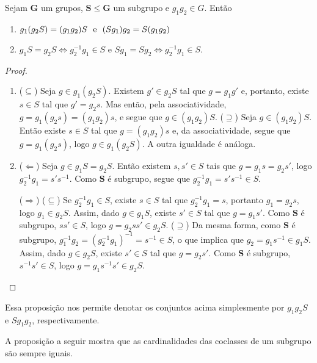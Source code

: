 \begin{proposition}
\label{alge:prop.gru.coclas}
Sejam $\bm G$ um grupos, $\bm S \leq \bm G$ um subgrupo e $g_1g_2 \in G$. Então
	\begin{enumerate}
	\item $g_1(g_2S) = (g_1g_2)S \text{\ \ e\ \ } (Sg_1)g_2 = S(g_1g_2)$
	\item $g_1S=g_2S \Leftrightarrow g_2^{-1}g_1 \in S$ e $Sg_1=Sg_2 \Leftrightarrow g_2^{-1}g_1 \in S$.
	\end{enumerate}
\end{proposition}
\begin{proof}
	\begin{enumerate}
	\item ($\subseteq$) Seja $g \in g_1(g_2S)$. Existem $g' \in g_2S$ tal que $g=g_1g'$ e, portanto, existe $s \in S$ tal que $g'=g_2s$. Mas então, pela associatividade, $g=g_1(g_2s) = (g_1g_2)s$, e segue que $g \in (g_1g_2)S$.
($\supseteq$) Seja $g \in (g_1g_2)S$. Então existe $s \in S$ tal que $g=(g_1g_2)s$ e, da associatividade, segue que $g=g_1(g_2s)$, logo $g \in g_1(g_2S)$. A outra igualdade é análoga.
	
	\item ($\Leftarrow$) Seja $g \in g_1S=g_2S$. Então existem $s,s' \in S$ tais que $g=g_1s=g_2s'$, logo $g_2^{-1}g_1=s's^{-1}$. Como $\bm S$ é subgrupo, segue que $g_2^{-1}g_1=s's^{-1} \in S$.

\noindent
($\Rightarrow$) ($\subseteq$) Se $g_2^{-1}g_1 \in S$, existe $s \in S$ tal que $g_2^{-1}g_1=s$, portanto $g_1=g_2s$, logo $g_1 \in g_2S$. Assim, dado $g \in g_1S$, existe $s' \in S$ tal que $g=g_1s'$. Como $\bm S$ é subgrupo, $ss' \in S$, logo $g=g_2ss' \in g_2S$. ($\supseteq$) Da mesma forma, como $\bm S$ é subgrupo, $g_1^{-1}g_2=(g_2^{-1}g_1)^{-1}=s^{-1} \in S$, o que implica que $g_2=g_1s^{-1} \in g_1S$. Assim, dado $g \in g_2S$, existe $s' \in S$ tal que $g=g_2s'$. Como $\bm S$ é subgrupo, $s^{-1}s' \in S$, logo $g=g_1s^{-1}s' \in g_2S$.
	\end{enumerate}

\end{proof}

Essa proposição nos permite denotar os conjuntos acima simplesmente por $g_1g_2S$ e $Sg_1g_2$, respectivamente.

A proposição a seguir mostra que as cardinalidades das coclasses de um subgrupo são sempre iguais.

